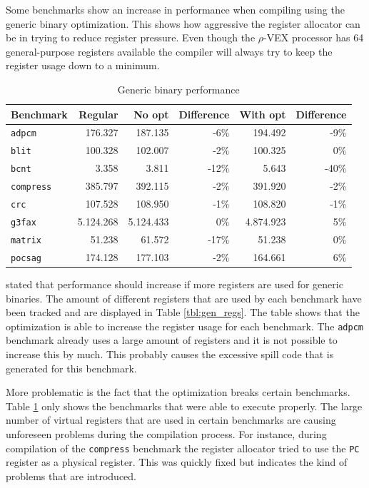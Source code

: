 Some benchmarks show an increase in performance when compiling using the generic binary optimization. This shows how aggressive the register allocator can be in trying to reduce register pressure. Even though the $\rho$-VEX processor has 64 general-purpose registers available the compiler will always try to keep the register usage down to a minimum.  

\begin{table}
  \centering
    \begin{tabular}{|l|r|r|r|r|r|}
    \hline
    \textbf{Benchmark} & \multicolumn{1}{|r|}{\textbf{Regular}} & \multicolumn{1}{|r|}{\textbf{No opt}}  & \multicolumn{1}{|r|}{\textbf{Difference}} & \multicolumn{1}{|r|}{\textbf{With opt}}  & \multicolumn{1}{|r|}{\textbf{Difference}} \\ \hline
	\texttt{adpcm} 		&  176.327 	&	 187.135 	& -6\%	&	 194.492 	& -9\%	\\ \hline
	\texttt{blit} 		&  100.328 	&	 102.007 	& -2\%	&	 100.325 	& 0\%	\\ \hline
	\texttt{bcnt} 		&  3.358  	&	 3.811 		& -12\%	&	 5.643	 	& -40\%	\\ \hline
	\texttt{compress} 	&  385.797 	&	 392.115 	& -2\%	&	 391.920 	& -2\%	\\ \hline
	\texttt{crc} 		&  107.528 	&	 108.950 	& -1\%	&	 108.820 	& -1\%	\\ \hline
	\texttt{g3fax} 		& 5.124.268	& 	 5.124.433	& 0\%	& 	 4.874.923 	& 5\%	\\ \hline
	\texttt{matrix} 	&  51.238 	&	 61.572 	& -17\%	&	 51.238 	& 0\%	\\ \hline
	\texttt{pocsag} 	& 174.128	& 	177.103		& -2\%	& 	 164.661  	& 6\%	\\ \hline
    \end{tabular}
  \caption{Generic binary performance}
  \label{tbl:generic_perf}
\end{table}

\cite{Anthony-Brandon:2013jk} stated that performance should increase if more registers are used for generic binaries. The amount of different registers that are used by each benchmark have been tracked and are displayed in Table \ref{tbl:gen_regs}. The table shows that the optimization is able to increase the register usage for each benchmark. The \texttt{adpcm} benchmark already uses a large amount of registers and it is not possible to increase this by much. This probably causes the excessive spill code that is generated for this benchmark.

More problematic is the fact that the optimization breaks certain benchmarks. Table \ref{tbl:generic_perf} only shows the benchmarks that were able to execute properly. The large number of virtual registers that are used in certain benchmarks are causing unforeseen problems during the compilation process. For instance, during compilation of the \texttt{compress} benchmark the register allocator tried to use the \texttt{PC} register  as a physical register. This was quickly fixed but indicates the kind of problems that are introduced.

